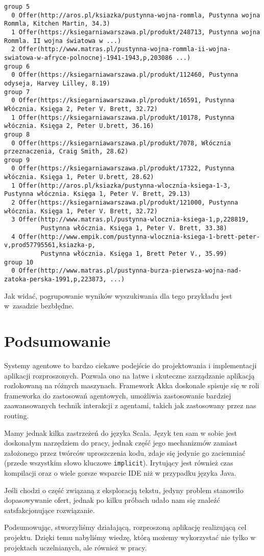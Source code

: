 \documentclass[a4paper,12pt]{mwart}
\begin{document}
\begin{verbatim}
group 5
  0 Offer(http://aros.pl/ksiazka/pustynna-wojna-rommla, Pustynna wojna Rommla, Kitchen Martin, 34.3)
  1 Offer(https://ksiegarniawarszawa.pl/produkt/248713, Pustynna wojna Rommla. II wojna światowa w ...)
  2 Offer(http://www.matras.pl/pustynna-wojna-rommla-ii-wojna-swiatowa-w-afryce-polnocnej-1941-1943,p,203086 ...)
group 6
  0 Offer(https://ksiegarniawarszawa.pl/produkt/112460, Pustynna odyseja, Harvey Lilley, 8.19)
group 7
  0 Offer(https://ksiegarniawarszawa.pl/produkt/16591, Pustynna Włócznia. Księga 2, Peter V. Brett, 32.72)
  1 Offer(https://ksiegarniawarszawa.pl/produkt/10178, Pustynna włócznia. Księga 2, Peter U.brett, 36.16)
group 8
  0 Offer(https://ksiegarniawarszawa.pl/produkt/7078, Włócznia przeznaczenia, Craig Smith, 28.62)
group 9
  0 Offer(https://ksiegarniawarszawa.pl/produkt/17322, Pustynna włócznia. Księga 1, Peter U.brett, 28.62)
  1 Offer(http://aros.pl/ksiazka/pustynna-wlocznia-ksiega-1-3, Pustynna włócznia. Księga 1, Peter V. Brett, 29.13)
  2 Offer(https://ksiegarniawarszawa.pl/produkt/121000, Pustynna włócznia. Księga 1, Peter V. Brett, 32.72)
  3 Offer(http://www.matras.pl/pustynna-wlocznia-ksiega-1,p,228819,
          Pustynna włócznia. Księga 1, Peter V. Brett, 33.38)
  4 Offer(http://www.empik.com/pustynna-wlocznia-ksiega-1-brett-peter-v,prod57795561,ksiazka-p,
          Pustynna włócznia. Księga 1, Brett Peter V., 35.99)
group 10
  0 Offer(http://www.matras.pl/pustynna-burza-pierwsza-wojna-nad-zatoka-perska-1991,p,223873, ...)
\end{verbatim}
\normalsize

Jak widać, pogrupowanie wyników wyszukiwania dla tego przykładu jest w~zasadzie
bezbłędne.

\section{Podsumowanie}
Systemy agentowe to bardzo ciekawe podejście do projektowania i implementacji
aplikacji rozproszonych. Pozwala ono na łatwe i skuteczne zarządzanie aplikacją
rozlokowaną na różnych maszynach. Framework Akka doskonale spisuje się w roli
frameworka do zastosowań agentowych, umożliwia zastosowanie bardziej
zaawansowanych technik interakcji z agentami, takich jak zastosowany przez nas
routing.

Mamy jednak kilka zastrzeżeń do języka Scala. Język ten sam w sobie
jest doskonałym narzędziem do pracy, jednak część jego mechanizmów zamiast
założonego przez twórców uproszczenia kodu, zdaje się jedynie go zaciemniać
(przede wszystkim słowo kluczowe \verb+implicit+).
Irytujący jest również czas kompilacji oraz o wiele gorsze wsparcie IDE niż
w przypadku języka Java.

Jeśli chodzi o część związaną z eksploracją tekstu, jedyny problem stanowiło
dopasowywanie ofert, jednak po kilku próbach udało nam się znaleźć
satsfakcjonujące rozwiązanie.

Podsumowując, stworzyliśmy działającą, rozproszoną aplikację
realizującą cel projektu. Dzięki temu nabyliśmy wiedzę, którą możemy wykorzystać
nie tylko w projektach uczelnianych, ale również w pracy.
\end{document}
